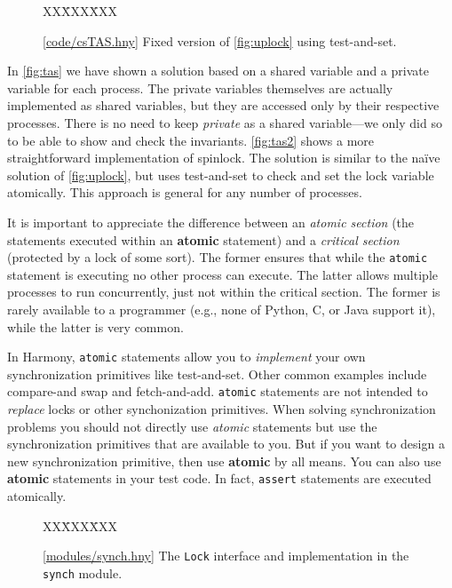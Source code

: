 \documentclass{report}
\newcommand{\harmonysource}[1]{
\begin{tabbing}
XX\=XXX\=XXX\kill
    
\end{tabbing}
}
\newcommand{\harmonylink}[1]{%
[\href{https://www.cs.cornell.edu/home/rvr/harmony/#1}{\underline{#1}}]%
}
\newenvironment{code}{
\tcolorbox
}{
\endtcolorbox
}
\begin{document}
\begin{figure}
\begin{code}
\harmonysource{csTAS}
\end{code}
\caption{\harmonylink{code/csTAS.hny} Fixed version of \autoref{fig:uplock} using test-and-set.}
\label{fig:tas2}
\end{figure}

In \autoref{fig:tas} we have shown a solution based on a shared
variable and a private variable for each process.   The private
variables themselves are actually implemented as shared variables,
but they are accessed only by their respective processes.
There is no need to keep \textit{private} as a shared
variable---we only did so to be able to show and check the invariants.
\autoref{fig:tas2} shows a more straightforward implementation of spinlock.
The solution is similar to the na\"{i}ve solution of \autoref{fig:uplock},
but uses test-and-set to check and set the lock variable atomically.
This approach is general for any number of processes.

It is important to appreciate the difference between an
\emph{atomic section} (the statements executed within an
\textbf{atomic} statement) and a \emph{critical section}
(protected by a lock of some sort).
The former ensures that while the
\texttt{atomic} statement is executing no other process can execute.
The latter allows multiple processes to run concurrently,
just not within the critical section.
The former is rarely available to a programmer (e.g., none of
Python, C, or Java support it), while the latter
is very common.

In Harmony, \texttt{atomic} statements allow you to \emph{implement} your own
synchronization primitives like test-and-set.  Other common examples
include compare-and swap and fetch-and-add.  \texttt{atomic} statements
are not intended to \emph{replace} locks or other synchonization primitives.
When solving synchronization problems you should not directly use
\emph{atomic} statements but use the synchronization primitives that are available
to you.  But if you want to design a new synchronization primitive, then
use \textbf{atomic} by all means.
You can also use \textbf{atomic} statements in your test code.
In fact, \texttt{assert} statements are executed atomically.

\begin{figure}
\begin{code}
\harmonysource{lockintf}
\end{code}
\caption{\harmonylink{modules/synch.hny} The \texttt{Lock} interface and implementation in the \texttt{synch} module.}
\label{fig:spinlocks}
\end{figure}
\end{document}
